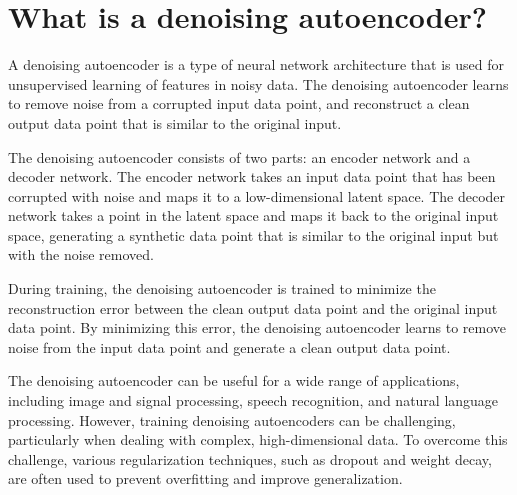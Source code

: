 \section{What is a denoising autoencoder?}
A denoising autoencoder is a type of neural network architecture that is used for unsupervised learning of features in noisy data. The denoising autoencoder learns to remove noise from a corrupted input data point, and reconstruct a clean output data point that is similar to the original input.

The denoising autoencoder consists of two parts: an encoder network and a decoder network. The encoder network takes an input data point that has been corrupted with noise and maps it to a low-dimensional latent space. The decoder network takes a point in the latent space and maps it back to the original input space, generating a synthetic data point that is similar to the original input but with the noise removed.

During training, the denoising autoencoder is trained to minimize the reconstruction error between the clean output data point and the original input data point. By minimizing this error, the denoising autoencoder learns to remove noise from the input data point and generate a clean output data point.

The denoising autoencoder can be useful for a wide range of applications, including image and signal processing, speech recognition, and natural language processing. However, training denoising autoencoders can be challenging, particularly when dealing with complex, high-dimensional data. To overcome this challenge, various regularization techniques, such as dropout and weight decay, are often used to prevent overfitting and improve generalization.

